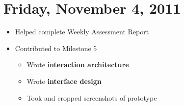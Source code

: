 \documentclass{article}
\begin{document}
\section{Friday, November 4, 2011}
\begin{itemize}
\item Helped complete Weekly Assessment Report
\item Contributed to Milestone 5
    \begin{itemize}
    \item Wrote \textbf{interaction architecture}
    \item Wrote \textbf{interface design}
    \item Took and cropped screenshots of prototype
    \end{itemize}
\end{itemize}
\end{document}
